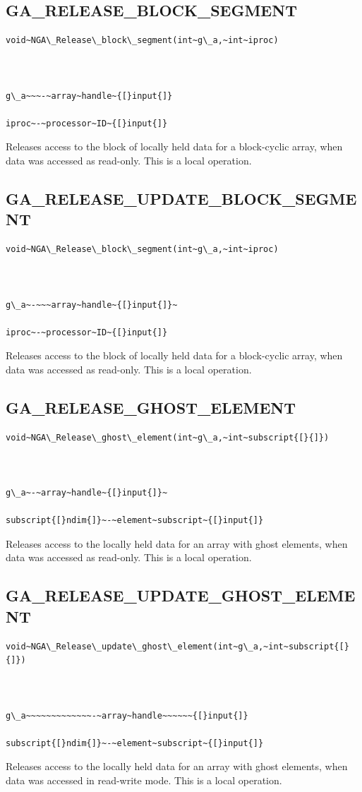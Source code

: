 \subsection*{\label{sub:GA_RELEASE_BLOCK_SEGMENT}GA\_RELEASE\_BLOCK\_SEGMENT}
\begin{verbatim}
void~NGA\_Release\_block\_segment(int~g\_a,~int~iproc)



g\_a~~~-~array~handle~{[}input{]}

iproc~-~processor~ID~{[}input{]}
\end{verbatim}
Releases access to the block of locally held data for a block-cyclic
array, when data was accessed as read-only. This is a local operation. 


\subsection*{\label{sub:GA_RELEASE_UPDATE_BLOCK_SEGMENT}GA\_RELEASE\_UPDATE\_BLOCK\_SEGMENT}
\begin{verbatim}
void~NGA\_Release\_block\_segment(int~g\_a,~int~iproc)



g\_a~-~~~array~handle~{[}input{]}~

iproc~-~processor~ID~{[}input{]}
\end{verbatim}
Releases access to the block of locally held data for a block-cyclic
array, when data was accessed as read-only. This is a local operation. 


\subsection*{\label{sub:GA_RELEASE_GHOST_ELEMENT}GA\_RELEASE\_GHOST\_ELEMENT}
\begin{verbatim}
void~NGA\_Release\_ghost\_element(int~g\_a,~int~subscript{[}{]})



g\_a~-~array~handle~{[}input{]}~

subscript{[}ndim{]}~-~element~subscript~{[}input{]}
\end{verbatim}
Releases access to the locally held data for an array with ghost elements,
when data was accessed as read-only. This is a local operation. 


\subsection*{\label{sub:GA_RELEASE_UPDATE_GHOST_ELEMENT}GA\_RELEASE\_UPDATE\_GHOST\_ELEMENT}
\begin{verbatim}
void~NGA\_Release\_update\_ghost\_element(int~g\_a,~int~subscript{[}{]})



g\_a~~~~~~~~~~~~~-~array~handle~~~~~~{[}input{]}

subscript{[}ndim{]}~-~element~subscript~{[}input{]}
\end{verbatim}
Releases access to the locally held data for an array with ghost elements,
when data was accessed in read-write mode. This is a local operation. 


